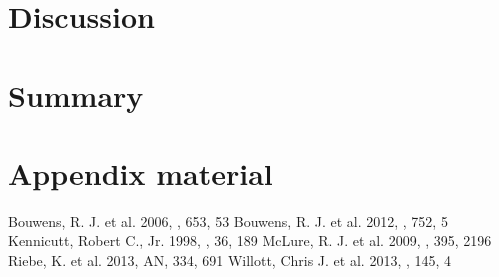 \documentclass[manuscript]{aastex}
\begin{document}
\section{Discussion}



\section{Summary}


\acknowledgments
%
\appendix

\section{Appendix material}

\begin{thebibliography}{}
 Bouwens, R. J. et al. 2006, \apj, 653, 53%
 Bouwens, R. J. et al. 2012, \apj, 752, 5 %
 Kennicutt, Robert C., Jr. 1998, \araa, 36, 189%
 McLure, R. J. et al. 2009, \mnras, 395, 2196%
 Riebe, K. et al. 2013, AN, 334, 691 %
 Willott, Chris J. et al. 2013, \aj, 145, 4%


\end{thebibliography}
\end{document}
